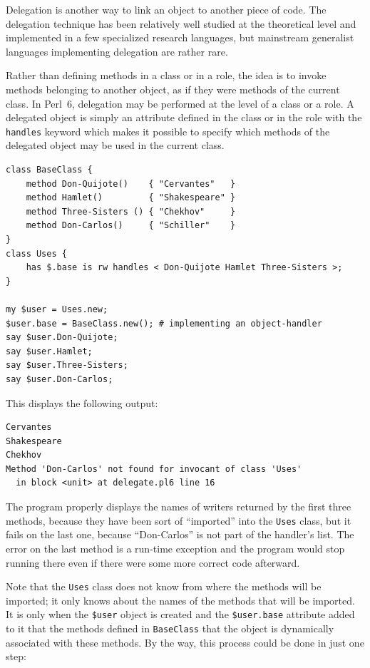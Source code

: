 Delegation is another way to link an object to another piece 
of code. The delegation technique has been relatively well 
studied at the theoretical level and implemented in a few 
specialized research languages, but mainstream generalist 
languages implementing delegation are rather rare.

Rather than defining methods in a class or in a role, the 
idea is to invoke methods belonging to another object, as 
if they were methods of the current class. In Perl~6, delegation 
may be performed at the level of a class or a role. A delegated 
object is simply an attribute defined in the class or in the role 
with the {\tt handles} keyword which makes it possible to specify 
which methods of the delegated object may be used in the 
current class.

  
   
  
\begin{verbatim}
class BaseClass {
    method Don-Quijote()    { "Cervantes"   }
    method Hamlet()         { "Shakespeare" }
    method Three-Sisters () { "Chekhov"     }
    method Don-Carlos()     { "Schiller"    }
}
class Uses { 
    has $.base is rw handles < Don-Quijote Hamlet Three-Sisters >;
}

my $user = Uses.new;
$user.base = BaseClass.new(); # implementing an object-handler
say $user.Don-Quijote;
say $user.Hamlet;
say $user.Three-Sisters;
say $user.Don-Carlos;
\end{verbatim}

This displays the following output:

\begin{verbatim}
Cervantes
Shakespeare
Chekhov
Method 'Don-Carlos' not found for invocant of class 'Uses'
  in block <unit> at delegate.pl6 line 16
\end{verbatim}

The program properly displays the names of writers returned 
by the first three methods, because they have been sort of 
``imported'' into the {\tt Uses} class, but it fails on the 
last one, because ``Don-Carlos'' is not part of the handler's 
list. The error on the last method is a run-time exception 
and the program would stop running there even if there 
were some more correct code afterward. 

Note that the {\tt Uses} class does not know from where the 
methods will be imported; it only knows about the names of 
the methods that will be imported. It is only when the 
\verb'$user' object is created and the \verb'$user.base' 
attribute added to it that the methods defined in {\tt BaseClass} 
that the object is dynamically associated with these methods. 
By the way, this process could be done in just one step:

